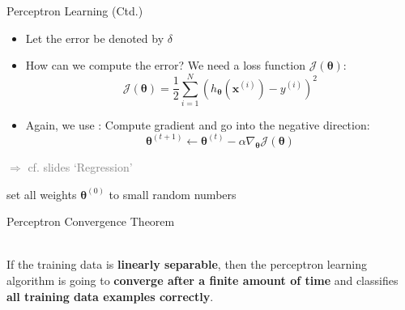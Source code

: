\begin{frame}{Perceptron Learning (Ctd.)}{}
	\begin{itemize}
		\item Let the error be denoted by $\delta$
		\item How can we compute the error? We need a loss function $\mathcal{J}(\bm{\theta})$:
		\begin{equation}
			\mathcal{J}(\bm{\theta}) = \frac{1}{2} \sum_{i=1}^N (h_{\bm{\theta}}(\bm{x}^{(i)}) - y^{(i)})^2
		\end{equation}
		\item Again, we use : Compute gradient and go into the negative direction:
		\begin{equation}
			\bm{\theta}^{(t+1)} \longleftarrow \bm{\theta}^{(t)} - \alpha \nabla_{\bm{\theta}} \mathcal{J}(\bm{\theta})
		\end{equation}
	\end{itemize}
	\textcolor{gray}{$\Rightarrow$ cf. slides `Regression'}
\end{frame}


\begin{frame}[plain]{}{}
	\begin{algorithm}[H]
		\DontPrintSemicolon
		\footnotesize
		
		\;
		set all weights $\bm{\theta}^{(0)}$ to small random numbers\;
		\Return{$\bm{\theta}$}
 		\caption{Perceptron Learning Algorithm}
	\end{algorithm}
\end{frame}


\begin{frame}{Perceptron Convergence Theorem}{}
	\begin{boxBlue}
		 \\

		If the training data is \textbf{linearly separable}, then the perceptron learning algorithm is going to
		\textbf{converge after a finite amount of time} and classifies \textbf{all training data examples correctly}.
	\end{boxBlue}
\end{frame}


